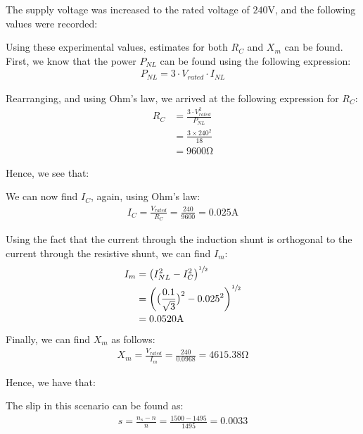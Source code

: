 \documentclass{article}
\begin{document}
The supply voltage was increased to the rated voltage of $240\si{\volt}$, and the following values were recorded:
\begin{center}
\end{center}

Using these experimental values, estimates for both $R_C$ and $X_m$ can be found. First, we know that the power $P_{NL}$ can be found using the following expression:
\begin{align*}
	P_{NL} = 3 \cdot V_{rated} \cdot I_{NL}
\end{align*}

Rearranging, and using Ohm's law, we arrived at the following expression for $R_C$:
\begin{align*}
	R_C &= \frac{3 \cdot V_{rated}^2}{P_{NL}}\\
		&= \frac{3 \times 240^2}{18}\\
		&= 9600 \si{\ohm}
\end{align*}

Hence, we see that:
\begin{center}
\end{center}
\vspace{0.5cm}
We can now find $I_C$, again, using Ohm's law:
\begin{align*}
	I_C = \frac{V_{rated}}{R_C} = \frac{240}{9600} = 0.025\si{\ampere}
\end{align*}

Using the fact that the current through the induction shunt is orthogonal to the current through the resistive shunt, we can find $I_m$:
\begin{align*}
	I_m &= \big(I_{NL}^2 - I_C^2\big)^{\sfrac{1}{2}}\\
		&= \bigg(\big(\frac{0.1}{\sqrt{3}}\big)^2 - 0.025^2 \bigg)^{\sfrac{1}{2}}\\
		&= 0.0520\si{\ampere}
\end{align*}

Finally, we can find $X_m$ as follows:
\begin{align*}
	X_m = \frac{V_{rated}}{I_m} = \frac{240}{0.0968} = 4615.38\si{\ohm}
\end{align*}

Hence, we have that:
\begin{center}
\end{center}
\vspace{0.5cm}
The slip in this scenario can be found as:
\begin{align*}
	s = \frac{n_s - n}{n} = \frac{1500 - 1495}{1495} = 0.0033
\end{align*}
\end{document}

